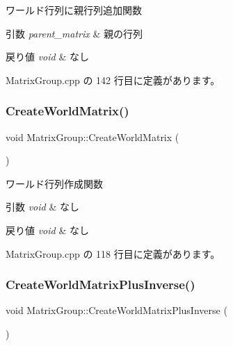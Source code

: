 ワールド行列に親行列追加関数 


\begin{DoxyParams}{引数}
{\em parent\+\_\+matrix} & 親の行列 \\
\hline
\end{DoxyParams}

\begin{DoxyRetVals}{戻り値}
{\em void} & なし \\
\hline
\end{DoxyRetVals}


 Matrix\+Group.\+cpp の 142 行目に定義があります。

\mbox{\label{class_matrix_group_a2a123f43e2af3c1767f7972bca9dfacb}} 
\subsubsection{\texorpdfstring{Create\+World\+Matrix()}{CreateWorldMatrix()}}
{\footnotesize\ttfamily void Matrix\+Group\+::\+Create\+World\+Matrix (\begin{DoxyParamCaption}{ }\end{DoxyParamCaption})}



ワールド行列作成関数 


\begin{DoxyParams}{引数}
{\em void} & なし \\
\hline
\end{DoxyParams}

\begin{DoxyRetVals}{戻り値}
{\em void} & なし \\
\hline
\end{DoxyRetVals}


 Matrix\+Group.\+cpp の 118 行目に定義があります。

\mbox{\label{class_matrix_group_a91fd88f4462a2a1eccf955382a4e1282}} 
\subsubsection{\texorpdfstring{Create\+World\+Matrix\+Plus\+Inverse()}{CreateWorldMatrixPlusInverse()}}
{\footnotesize\ttfamily void Matrix\+Group\+::\+Create\+World\+Matrix\+Plus\+Inverse (\begin{DoxyParamCaption}{ }\end{DoxyParamCaption})}



